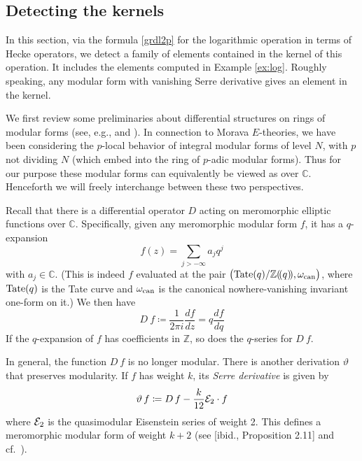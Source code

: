 \documentclass{gtpart}
\theoremstyle{definition}
\theoremstyle{remark}
\newcommand{\mb}[1]{\mathbb{#1}}
\newcommand{\CE}{{\cal E}}
\newcommand{\BC}{{\mb C}}
\newcommand{\BZ}{{\mb Z}}
\newcommand{\can}{{\rm can}}
\renewcommand{\o}{\omega}
\newcommand{\ce}{\coloneqq}
\newcommand{\lp}{(\!(}
\newcommand{\rp}{)\!)}
\renewcommand{\=}{\approx}
\renewcommand{\-}{\sim}
\newcommand{\Tate}{{\rm Tate}}
\numberwithin{equation}{section}
\numberwithin{thm}{section}
\begin{document}
\subsection{Detecting the kernels}
\label{subsec:thm}

In this section, via the formula \eqref{grdl2p} for the logarithmic operation in terms of Hecke operators, we 
detect a family of elements contained in the kernel of this operation.  
It includes the elements computed in Example \ref{ex:log}.  
Roughly speaking, any modular form with vanishing Serre derivative gives an element in the kernel.  

We first review some preliminaries about differential structures on rings of modular forms 
(see, e.g., \cite[Section 5 of Part 1]{1-2-3} and \cite[Section 2.3]{web}).  
In connection to Morava $E$-theories, 
we have been considering the $p$-local behavior of integral modular forms of level $N$, 
with $p$ not dividing $N$ 
(which embed into the ring of $p$-adic modular forms).  
Thus for our purpose these modular forms can equivalently be viewed as over $\BC$.  
Henceforth we will freely interchange between these two perspectives.  

Recall that there is a differential operator $D$ acting on meromorphic elliptic functions over $\BC$.  
Specifically, given any meromorphic modular form $f$, it has a $q$-expansion 
\[
 f(z) = \sum_{j > -\infty} a_j q^j 
\]
with $a_j \in \BC$.  
(This is indeed $f$ evaluated at the pair $\big(\Tate(q) / \BZ \lp q \rp, \o_\can\big)$, 
where $\Tate(q)$ is the Tate curve and $\o_\can$ is the canonical nowhere-vanishing invariant one-form on it.)  
We then have 
\begin{equation}
 \label{ramanujan}
 D ~\! f \ce \frac{1}{2 \pi i} \frac{df}{dz} = q \frac{df}{dq} 
\end{equation}
If the $q$-expansion of $f$ has coefficients in $\BZ$, so does the $q$-series for $D ~\! f$.  

In general, the function $D ~\! f$ is no longer modular.  
There is another derivation $\vartheta$ that preserves modularity.  
If $f$ has weight $k$, its {\em Serre derivative} is given by 
\begin{equation}
 \label{serre}
 \vartheta ~\! f \ce D ~\! f - \frac{k}{12} \CE_2 \cdot f 
\end{equation}
where $\CE_2$ is the quasimodular Eisenstein series of weight 2.  
This defines a meromorphic modular form of weight $k + 2$ (see [ibid., Proposition 2.11] and cf.~\cite[Th\'eor\`eme 5(a)]{fmpadiq}).  
\end{document}
